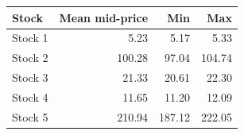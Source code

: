 \begin{tabular}{lrrr}
\toprule
Stock & Mean mid-price & Min & Max \\
\midrule
Stock 1 & 5.23 & 5.17 & 5.33 \\
Stock 2 & 100.28 & 97.04 & 104.74 \\
Stock 3 & 21.33 & 20.61 & 22.30 \\
Stock 4 & 11.65 & 11.20 & 12.09 \\
Stock 5 & 210.94 & 187.12 & 222.05 \\
\bottomrule
\end{tabular}
